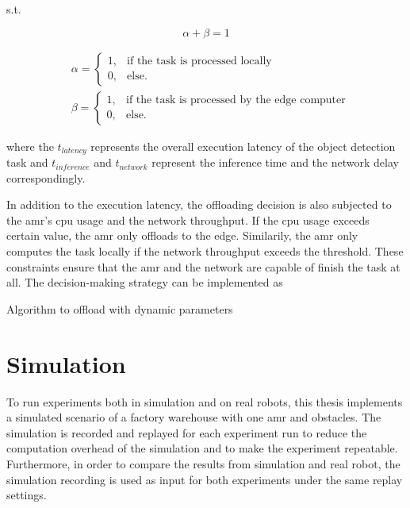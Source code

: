 s.t.

\begin{equation*}
    \alpha + \beta = 1
\end{equation*}

\begin{align*}
    & \alpha = \begin{cases}
        1, & \text{if the task is processed locally} \\
        0, & \text{else.}
    \end{cases} \\
    & \beta = \begin{cases}
        1, & \text{if the task is processed by the edge computer} \\
        0, & \text{else.}
    \end{cases}
\end{align*}

where the $t_{latency}$ represents the overall execution latency of the object detection task and $t_{inference}$ and $t_{network}$ represent the inference time and the network delay correspondingly. 

In addition to the execution latency, the offloading decision is also subjected to the \gls{amr}'s \gls{cpu} usage and the network throughput. If the \gls{cpu} usage exceeds certain value, the \gls{amr} only offloads to the edge. Similarily, the \gls{amr} only computes the task locally if the network throughput exceeds the threshold. These constraints ensure that the \gls{amr} and the network are capable of finish the task at all. The decision-making strategy can be implemented as 

\begin{algorithm}[htp]
\caption{Algorithm to offload with dynamic parameters}\label{alg:decision_making_strategy}
\begin{algorithmic}[1]
    \EndFunction
\end{algorithmic}
\end{algorithm}



\section{Simulation}\label{sec:general_setup:simulation}

To run experiments both in simulation and on real robots, this thesis implements a simulated scenario of a factory warehouse with one \gls{amr} and obstacles. The simulation is recorded and replayed for each experiment run to reduce the computation overhead of the simulation and to make the experiment repeatable. Furthermore, in order to compare the results from simulation and real robot, the simulation recording is used as input for both experiments under the same replay settings. 

